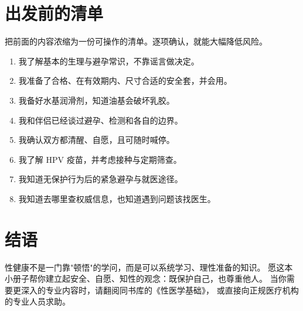 \documentclass[12pt,UTF8,openany]{ctexbook}
\begin{document}
\chapter{出发前的清单}

把前面的内容浓缩为一份可操作的清单。逐项确认，就能大幅降低风险。

\begin{enumerate}[leftmargin=2em,itemsep=0.4em]
  \item 我了解基本的生理与避孕常识，不靠谣言做决定。
  \item 我准备了合格、在有效期内、尺寸合适的安全套，并会用。
  \item 我备好水基润滑剂，知道油基会破坏乳胶。
  \item 我和伴侣已经谈过避孕、检测和各自的边界。
  \item 我确认双方都清醒、自愿，且可随时喊停。
  \item 我了解 HPV 疫苗，并考虑接种与定期筛查。
  \item 我知道无保护行为后的紧急避孕与就医途径。
  \item 我知道去哪里查权威信息，也知道遇到问题该找医生。
\end{enumerate}

\chapter*{结语}

性健康不是一门靠"顿悟"的学问，而是可以系统学习、理性准备的知识。
愿这本小册子帮你建立起安全、自愿、知性的观念：既保护自己，也尊重他人。
当你需要更深入的专业内容时，请翻阅同书库的《性医学基础》，
或直接向正规医疗机构的专业人员求助。

\vspace{2em}
\end{document}
